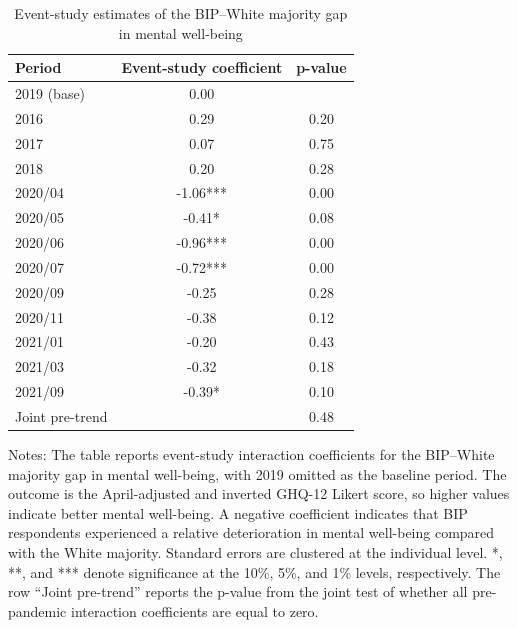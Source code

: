\begin{table}[htbp]
\centering
\caption{Event-study estimates of the BIP--White majority gap in mental well-being}
\label{tab:event_study_bip}
\small
\begin{tabular}{lcc}
\toprule
Period & Event-study coefficient & p-value \\
\midrule
2019 (base) & 0.00 &  \\
2016 & 0.29 & 0.20 \\
2017 & 0.07 & 0.75 \\
2018 & 0.20 & 0.28 \\
2020/04 & -1.06*** & 0.00 \\
2020/05 & -0.41* & 0.08 \\
2020/06 & -0.96*** & 0.00 \\
2020/07 & -0.72*** & 0.00 \\
2020/09 & -0.25 & 0.28 \\
2020/11 & -0.38 & 0.12 \\
2021/01 & -0.20 & 0.43 \\
2021/03 & -0.32 & 0.18 \\
2021/09 & -0.39* & 0.10 \\
Joint pre-trend &  & 0.48 \\
\bottomrule
\end{tabular}

\begin{flushleft}
\footnotesize
Notes: The table reports event-study interaction coefficients for the BIP--White majority gap in mental well-being, with 2019 omitted as the baseline period. The outcome is the April-adjusted and inverted GHQ-12 Likert score, so higher values indicate better mental well-being. A negative coefficient indicates that BIP respondents experienced a relative deterioration in mental well-being compared with the White majority. Standard errors are clustered at the individual level. *, **, and *** denote significance at the 10\%, 5\%, and 1\% levels, respectively. The row ``Joint pre-trend'' reports the p-value from the joint test of whether all pre-pandemic interaction coefficients are equal to zero.
\end{flushleft}
\end{table}